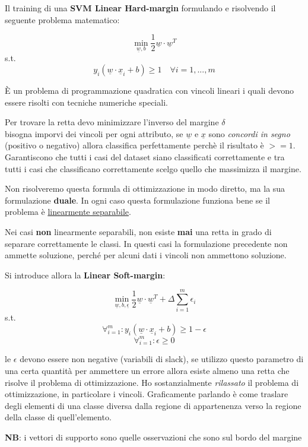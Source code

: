 Il training di una \textbf{SVM Linear Hard-margin} formulando e risolvendo il seguente problema matematico: 

\[ \min_{\underline{w},b} \frac{1}{2}\underline{w} \cdot \underline{w}^T \]
\qquad s.t.
\[ y_i (\underline{w} \cdot \underline{x}_i + b) \ge 1 \quad \forall i = 1, ..., m\]

È un problema di programmazione quadratica con vincoli lineari i quali devono essere risolti con tecniche numeriche speciali.

Per trovare la retta devo minimizzare l'inverso del margine $\delta$\\
bisogna imporvi dei vincoli per ogni attributo, se $\underline{w}$ e $\underline{x}$ sono \textit{concordi in segno} (positivo o negativo) allora classifica perfettamente perch\`e il risultato è $>= 1$. Garantiscono che tutti i casi del dataset siano classificati correttamente e tra tutti i casi che classificano correttamente scelgo quello che massimizza il margine. 

Non risolveremo questa formula di ottimizzazione in modo diretto, ma la sua formulazione \textbf{duale}. In ogni caso questa formulazione funziona bene se il problema \`e \underline{linearmente separabile}.

Nei casi \textbf{non} linearmente separabili, non esiste \textbf{mai} una retta in grado di separare correttamente le classi. In questi casi la formulazione precedente non ammette soluzione, perch\'e per alcuni dati i vincoli non ammettono soluzione. 

Si introduce allora la \textbf{Linear Soft-margin}:

\[ \min_{\underline{w},b,\underline{\epsilon}} \frac{1}{2}\underline{w} \cdot \underline{w}^T + \Delta \sum_{i=1}^{m} \epsilon_i \]
\qquad s.t.
\[\forall_{i=1}^m :  y_i (\underline{w} \cdot \underline{x}_i + b) \ge 1 - \epsilon \] \[\forall_{i=1}^m : \epsilon \ge 0\]

le $\epsilon$ devono essere non negative (variabili di slack), se utilizzo questo parametro di una certa quantit\`a per ammettere un errore allora esiste almeno una retta che risolve il problema di ottimizzazione. Ho sostanzialmente \textit{rilassato} il problema di ottimizzazione, in particolare i vincoli. Graficamente parlando \`e come traslare degli elementi di una classe diversa dalla regione di appartenenza verso la regione della classe di quell'elemento.

\textbf{NB}: i vettori di supporto sono quelle osservazioni che sono sul bordo del margine


